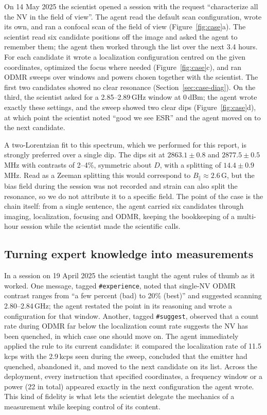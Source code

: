\documentclass[10pt]{article}
\newcommand{\code}[1]{\texttt{#1}}
\begin{document}
On 14 May 2025 the scientist opened a session with the request ``characterize all the NV in the field of view''.
The agent read the default scan configuration, wrote its own, and ran a confocal scan of the field of view (Figure~\ref{fig:case}a).
The scientist read six candidate positions off the image and asked the agent to remember them; the agent then worked through the list over the next 3.4 hours.
For each candidate it wrote a localization configuration centred on the given coordinates, optimized the focus where needed (Figure~\ref{fig:case}c), and ran ODMR sweeps over windows and powers chosen together with the scientist.
The first two candidates showed no clear resonance (Section~\ref{sec:case-diag}).
On the third, the scientist asked for a 2.85--2.89\,GHz window at 0\,dBm; the agent wrote exactly these settings, and the sweep showed two clear dips (Figure~\ref{fig:case}d), at which point the scientist noted ``good we see ESR'' and the agent moved on to the next candidate.

A two-Lorentzian fit to this spectrum, which we performed for this report, is strongly preferred over a single dip.
The dips sit at $2863.1\pm0.8$ and $2877.5\pm0.5$\,MHz with contrasts of 2--4\%, symmetric about $D$, with a splitting of $14.4\pm0.9$\,MHz.
Read as a Zeeman splitting this would correspond to $B_\parallel\approx2.6$\,G, but the bias field during the session was not recorded and strain can also split the resonance, so we do not attribute it to a specific field.
The point of the case is the chain itself: from a single sentence, the agent carried six candidates through imaging, localization, focusing and ODMR, keeping the bookkeeping of a multi-hour session while the scientist made the scientific calls.

\subsection{Turning expert knowledge into measurements}
\label{sec:case-guidance}
In a session on 19 April 2025 the scientist taught the agent rules of thumb as it worked.
One message, tagged \code{\#experience}, noted that single-NV ODMR contrast ranges from ``a few percent (bad) to 20\% (best)'' and suggested scanning 2.80--2.84\,GHz; the agent restated the point in its reasoning and wrote a configuration for that window.
Another, tagged \code{\#suggest}, observed that a count rate during ODMR far below the localization count rate suggests the NV has been quenched, in which case one should move on.
The agent immediately applied the rule to its current candidate: it compared the localization rate of 11.5\,kcps with the 2.9\,kcps seen during the sweep, concluded that the emitter had quenched, abandoned it, and moved to the next candidate on its list.
Across the deployment, every instruction that specified coordinates, a frequency window or a power (22 in total) appeared exactly in the next configuration the agent wrote.
This kind of fidelity is what lets the scientist delegate the mechanics of a measurement while keeping control of its content.
\end{document}
